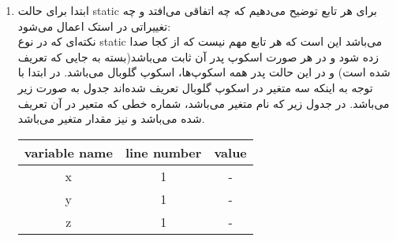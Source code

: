 \begin{enumerate}
	\item 
	ابتدا برای حالت static برای هر تابع توضیح می‌دهیم که چه اتفاقی می‌افتد و چه تغییراتی در استک اعمال می‌شود:\\
	نکته‌ای که در نوع static می‌باشد این است که هر تابع مهم نیست که از کجا صدا زده شود و در هر صورت اسکوپ پدر آن ثابت می‌باشد(بسته به جایی که تعریف شده است) و در این حالت پدر همه اسکوپ‌ها، اسکوپ گلوبال می‌باشد.
	در ابتدا با توجه به اینکه سه متغیر در اسکوپ گلوبال تعریف شده‌اند جدول به صورت زیر می‌باشد. در جدول زیر  که نام متغیر می‌باشد،  شماره خطی که متعیر در آن تعریف شده می‌باشد و  نیز مقدار متغیر می‌باشد.
	\begin{latin}
		\begin{center}
			\begin{tabular}{|c|c|c|}
				\hline
				variable name & line number & value\\
				\hline
				x & 1 & -\\
				\hline
				y & 1 & -\\
				\hline
				z & 1 & -\\
				\hline
			\end{tabular}
		\end{center}
	\end{latin}


\end{enumerate}
